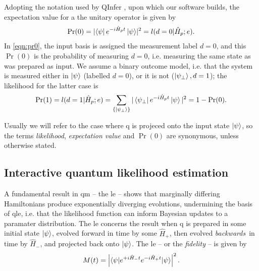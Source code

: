 Adopting the notation used by QInfer \cite{qinfer-1_0}, upon which our software builds, 
    the expectation value for a the unitary operator is given by
\begin{equation}\label{eqn:pr0}
    \Pr(0) =  \lvert \bra{\psi} e^{-i \hat{H}_p t} \ket{\psi}\rvert^2  = l(d=0 | \hat{H}_p; e).
\end{equation}
In \cref{eqn:pr0}, the input basis is assigned the measurement label $d=0$, and this $\Pr(0)$ is the probability 
    of measuring $d=0$, i.e. measuring the same state as was prepared as input. 
We assume a binary outcome model\footnotemark, 
    i.e. that the system is measured either in $\ket{\psi}$ (labelled $d=0$), or it is not ($\ket{\psi_{\perp}}, d=1$);
    the \gls{likelihood} for the latter case is
\begin{equation}\label{eqn:pr1}
    \Pr(1) = l(d=1 | \hat{H}_p; e) = \sum_{\{\ket{\psi_{\perp}}\}} | \bra{\psi_{\perp}} e^{-i \hat{H}_p t} \ket{\psi}  |^2 = 1 - \Pr(0).
\end{equation}

\par 
Usually we will refer to the case where \gls{q} is projeced onto the input state $\ket{\psi}$, 
    so the terms \emph{likelihood}, \emph{expectation value} and \emph{$\Pr(0)$} are synonymous, 
    unless otherwise stated. 


\subsection{Interactive quantum likelihood estimation}\label{sec:iqle}
A fundamental result in \gls{qm} -- the \gls{le} -- shows that marginally differing Hamiltonians 
    produce exponentially diverging evolutions,  undermining the basis of \gls{qle}, 
    i.e. that the likelihood function can inform Bayesian updates to a paramater distribution. 
The \gls{le} concerns the result when \gls{q} is prepared in some initial state $\ket{\psi}$, 
    evolved forward in time by some $\hat{H}_+$, then evolved \emph{backwards}\footnotemark \ in time by $\hat{H}_{-}$,
    and projected back onto $\ket{\psi}$. 
The \gls{le} -- or the \emph{fidelity} -- is given by 
\begin{equation}
    \label{eqn:loschmidt_echo}
    M(t) = \left\lvert  \braket{ \psi | e^{+i\hat{H}_{-} t} e^{-i \hat{H}_{+} t} | \psi}  \right\rvert^2.
\end{equation}
\par


